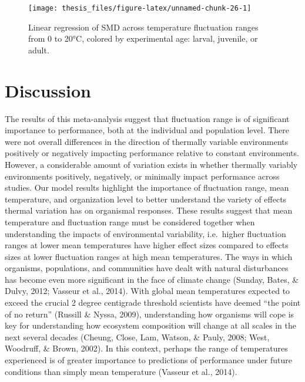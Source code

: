 \documentclass[12pt,twoside]{reedthesis}
\begin{document}
\begin{figure}

{\centering \texttt{[image: thesis\_files/figure-latex/unnamed-chunk-26-1]} 

}

\caption[Effect sizes across temperature range by experimental age]{Linear regression of SMD across temperature fluctuation ranges from 0 to 20°C, colored by experimental age: larval, juvenile, or adult.}\label{fig:unnamed-chunk-26}
\end{figure}
\hypertarget{discussion}{%
\chapter{Discussion}\label{discussion}}

The results of this meta-analysis suggest that fluctuation range is of significant importance to performance, both at the individual and population level. There were not overall differences in the direction of thermally variable environments positively or negatively impacting performance relative to constant environments. However, a considerable amount of variation exists in whether thermally variably environments positively, negatively, or minimally impact performance across studies. Our model results highlight the importance of fluctuation range, mean temperature, and organization level to better understand the variety of effects thermal variation has on organismal responses. These results suggest that mean temperature and fluctuation range must be considered together when understanding the impacts of environmental variability, i.e.~higher fluctuation ranges at lower mean temperatures have higher effect sizes compared to effects sizes at lower fluctuation ranges at high mean temperatures. The ways in which organisms, populations, and communities have dealt with natural disturbances has become even more significant in the face of climate change (Sunday, Bates, \& Dulvy, 2012; Vasseur et al., 2014). With global mean temperatures expected to exceed the crucial 2 degree centigrade threshold scientists have deemed ``the point of no return'' (Russill \& Nyssa, 2009), understanding how organisms will cope is key for understanding how ecosystem composition will change at all scales in the next several decades (Cheung, Close, Lam, Watson, \& Pauly, 2008; West, Woodruff, \& Brown, 2002). In this context, perhaps the range of temperatures experienced is of greater importance to predictions of performance under future conditions than simply mean temperature (Vasseur et al., 2014).
\end{document}
